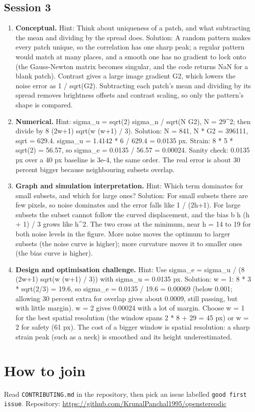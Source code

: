 \documentclass[11pt,a4paper]{article}
\begin{document}
\subsection*{Session 3}
\begin{enumerate}[nosep]
\item \textbf{Conceptual.} Hint: Think about uniqueness of a patch, and what subtracting the mean and dividing by the spread does. Solution: A random pattern makes every patch unique, so the correlation has one sharp peak; a regular pattern would match at many places, and a smooth one has no gradient to lock onto (the Gauss-Newton matrix becomes singular, and the code returns NaN for a blank patch). Contrast gives a large image gradient G2, which lowers the noise error as 1 / sqrt(G2). Subtracting each patch's mean and dividing by its spread removes brightness offsets and contrast scaling, so only the pattern's shape is compared.
\item \textbf{Numerical.} Hint: sigma\_u = sqrt(2) sigma\_n / sqrt(N G2), N = 29\textasciicircum{}2; then divide by 8 (2w+1) sqrt(w (w+1) / 3). Solution: N = 841, N * G2 = 396111, sqrt = 629.4. sigma\_u = 1.4142 * 6 / 629.4 = 0.0135 px. Strain: 8 * 5 * sqrt(2) = 56.57, so sigma\_e = 0.0135 / 56.57 = 0.00024. Sanity check: 0.0135 px over a 40 px baseline is 3e-4, the same order. The real error is about 30 percent bigger because neighbouring subsets overlap.
\item \textbf{Graph and simulation interpretation.} Hint: Which term dominates for small subsets, and which for large ones? Solution: For small subsets there are few pixels, so noise dominates and the error falls like 1 / (2h+1). For large subsets the subset cannot follow the curved displacement, and the bias b h (h + 1) / 3 grows like h\textasciicircum{}2. The two cross at the minimum, near h = 14 to 19 for both noise levels in the figure. More noise moves the optimum to larger subsets (the noise curve is higher); more curvature moves it to smaller ones (the bias curve is higher).
\item \textbf{Design and optimisation challenge.} Hint: Use sigma\_e = sigma\_u / (8 (2w+1) sqrt(w (w+1) / 3)) with sigma\_u = 0.0135 px. Solution: w = 1: 8 * 3 * sqrt(2/3) = 19.6, so sigma\_e = 0.0135 / 19.6 = 0.00069 (below 0.001; allowing 30 percent extra for overlap gives about 0.0009, still passing, but with little margin). w = 2 gives 0.00024 with a lot of margin. Choose w = 1 for the best spatial resolution (the window spans 2 * 8 + 29 = 45 px) or w = 2 for safety (61 px). The cost of a bigger window is spatial resolution: a sharp strain peak (such as a neck) is smoothed and its height underestimated.
\end{enumerate}

\section{How to join}
Read \texttt{CONTRIBUTING.md} in the repository, then pick an issue labelled \texttt{good first issue}. Repository: \url{https://github.com/KrunalPanchal1995/openstereodic}
\end{document}
